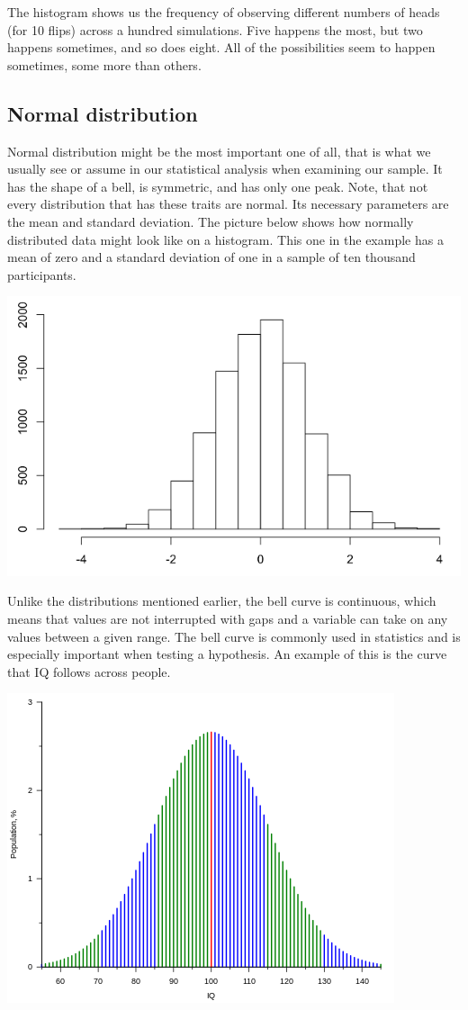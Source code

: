 \documentclass[
]{book}
\begin{document}
The histogram shows us the frequency of observing different numbers of heads (for 10 flips) across a hundred simulations. Five happens the most, but two happens sometimes, and so does eight. All of the possibilities seem to happen sometimes, some more than others.

\hypertarget{normal-distribution}{%
\subsection{Normal distribution}\label{normal-distribution}}

Normal distribution might be the most important one of all, that is what we usually see or assume in our statistical analysis when examining our sample. It has the shape of a bell, is symmetric, and has only one peak. Note, that not every distribution that has these traits are normal. Its necessary parameters are the mean and standard deviation. The picture below shows how normally distributed data might look like on a histogram. This one in the example has a mean of zero and a standard deviation of one in a sample of ten thousand participants.

\includegraphics{img/ch4/4.5normdistr.png}

Unlike the distributions mentioned earlier, the bell curve is continuous, which means that values are not interrupted with gaps and a variable can take on any values between a given range. The bell curve is commonly used in statistics and is especially important when testing a hypothesis. An example of this is the curve that IQ follows across people.

\includegraphics{img/ch4/4.5egiq.png}
\end{document}
